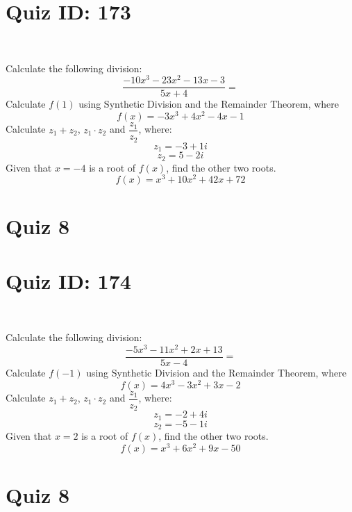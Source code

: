 \documentclass{exam}
\begin{document}
\section*{Quiz ID: 173}
\vspace{0.5cm}\
\vspace{1cm}\
\begin{questions}
\question Calculate the following division:\[\dfrac{
-10x^3 - 23x^2 - 13x - 3}{
5x + 4}=\] \makeemptybox{\stretch{2}}
\question Calculate $f(1)$ using Synthetic Division and the Remainder Theorem, where\[f(x) = 
-3x^3 + 4x^2 - 4x - 1\]
\newpage\question Calculate $z_1+z_2$, $z_1\cdot z_2$ and $\dfrac{z_1}{z_2}$, where:\[z_1=-3+1\mathit{i}\]\[z_2=5-2\mathit{i}\]
\question Given that $x=-4$ is a root of $f(x)$, find the other two roots.\[f(x)=
x^3 + 10x^2 + 42x + 72\]\makeemptybox{\stretch{1}}
\end{questions}\newpage
\newpage
\section*{Quiz 8}
\section*{Quiz ID: 174}
\vspace{0.5cm}\
\vspace{1cm}\
\begin{questions}
\question Calculate the following division:\[\dfrac{
-5x^3 - 11x^2 + 2x + 13}{
5x - 4}=\] 
\question Calculate $f(-1)$ using Synthetic Division and the Remainder Theorem, where\[f(x) = 
4x^3 - 3x^2 + 3x - 2\]
\newpage\question Calculate $z_1+z_2$, $z_1\cdot z_2$ and $\dfrac{z_1}{z_2}$, where:\[z_1=-2+4\mathit{i}\]\[z_2=-5-1\mathit{i}\]\makeemptybox{\stretch{1}}
\question Given that $x=2$ is a root of $f(x)$, find the other two roots.\[f(x)=
x^3 + 6x^2 + 9x - 50\]\makeemptybox{\stretch{1}}
\end{questions}\newpage
\newpage
\section*{Quiz 8}
\end{document}
